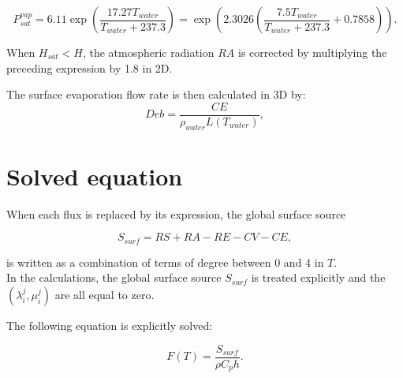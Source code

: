 \begin{equation}
  P_{sat}^{vap} = 6.11 \exp \left( \frac{17.27 T_{water}}{T_{water} + 237.3} \right)
  = \exp \left( 2.3026 \left( \frac{7.5 T_{water}}{T_{water} + 237.3} + 0.7858 \right) \right).
\end{equation}

When $H_{sat} < H$, the atmospheric radiation $RA$ is corrected
by multiplying the preceding expression by 1.8 in 2D.

The surface evaporation flow rate is then calculated in 3D by:
\begin{equation}
Deb = \frac{CE}{\rho_{water}L(T_{water})},
\end{equation}

\section{Solved equation}

When each flux is replaced by its expression, the global surface source

\begin{equation}
  S_{surf} = RS + RA - RE - CV - CE,
\end{equation}

is written as a combination of terms of degree between 0 and 4 in $T$.\\


In the calculations, the global surface source $S_{surf}$ is treated explicitly
and the $(\lambda_i^j, \mu_i^j)$ are all equal to zero.

The following equation is explicitly solved:

\begin{equation}
  F(T) = \frac{S_{surf}}{\rho C_p h}.
\end{equation}
